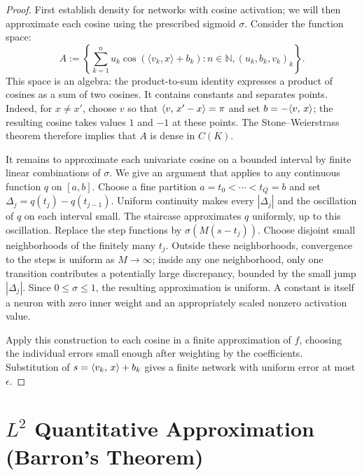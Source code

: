 \begin{proof}
First establish density for networks with cosine activation; we will then approximate each cosine using the prescribed sigmoid $\sigma$.
%
Consider the function space:
\[
	A := \left\{ \sum_{k=1}^n u_k \cos(\langle v_k, x \rangle + b_k) : n \in \mathbb{N}, (u_k, b_k, v_k)_k \right\}.
\]
This space is an algebra: the product-to-sum identity expresses a product of cosines as a sum of two cosines. It contains constants and separates points. Indeed, for $x\neq x'$, choose $v$ so that $\langle v,\,x'-x\rangle=\pi$ and set $b=-\langle v,\,x\rangle$; the resulting cosine takes values $1$ and $-1$ at these points. The Stone--Weierstrass theorem therefore implies that $A$ is dense in $C(K)$.

It remains to approximate each univariate cosine on a bounded interval by finite linear combinations of $\sigma$. We give an argument that applies to any continuous function $q$ on $[a,b]$. Choose a fine partition $a=t_0<\cdots<t_Q=b$ and set $\Delta_j=q(t_j)-q(t_{j-1})$. Uniform continuity makes every $|\Delta_j|$ and the oscillation of $q$ on each interval small. The staircase
\eq{q(t_0)+\sum_{j=1}^Q\Delta_j1_{[t_j,+\infty)}(s)}
approximates $q$ uniformly, up to this oscillation. Replace the step functions by $\sigma(M(s-t_j))$. Choose disjoint small neighborhoods of the finitely many $t_j$. Outside these neighborhoods, convergence to the steps is uniform as $M\to\infty$; inside any one neighborhood, only one transition contributes a potentially large discrepancy, bounded by the small jump $|\Delta_j|$. Since $0\leq\sigma\leq1$, the resulting approximation is uniform. A constant is itself a neuron with zero inner weight and an appropriately scaled nonzero activation value.

Apply this construction to each cosine in a finite approximation of $f$, choosing the individual errors small enough after weighting by the coefficients. Substitution of $s=\langle v_k,\,x\rangle+b_k$ gives a finite network with uniform error at most $\epsilon$.
\end{proof}

\section{\texorpdfstring{$L^2$}{Mean-square} Quantitative Approximation (Barron's Theorem)}

